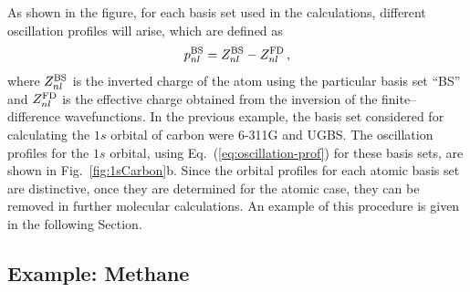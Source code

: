 \documentclass[10pt]{article}
\begin{document}
As shown in the figure, for each basis set used in the calculations,
different oscillation profiles will arise, which are defined as 
\begin{equation}
 p_{nl}^{\mbox{\scriptsize BS}} = Z_{nl}^{\mbox{\scriptsize BS}}-
 Z_{nl}^{\mbox{\scriptsize FD}} \,,
 \label{eq:oscillation-prof}
\end{equation}
where $Z_{nl}^{\mbox{\scriptsize BS}}$ is the inverted charge of the atom 
using the particular basis set ``BS'' and 
$Z_{nl}^{\mbox{\scriptsize FD}}$ is the effective charge obtained 
from the inversion of the finite--difference wavefunctions. 
In the previous example, the basis set considered for calculating 
the $1s$ orbital of carbon were \mbox{6-311G} and UGBS. The 
oscillation profiles for the $1s$ orbital, using Eq.~(\ref{eq:oscillation-prof}) 
for these basis sets, are shown in Fig.~\ref{fig:1sCarbon}b. 
Since the orbital profiles for each atomic basis set are distinctive,
once they are determined for the atomic case, they can be removed 
in further molecular calculations. An example of this procedure 
is given in the following Section.

\subsection{Example: Methane}
\label{sec:dimmethane}
\end{document}
